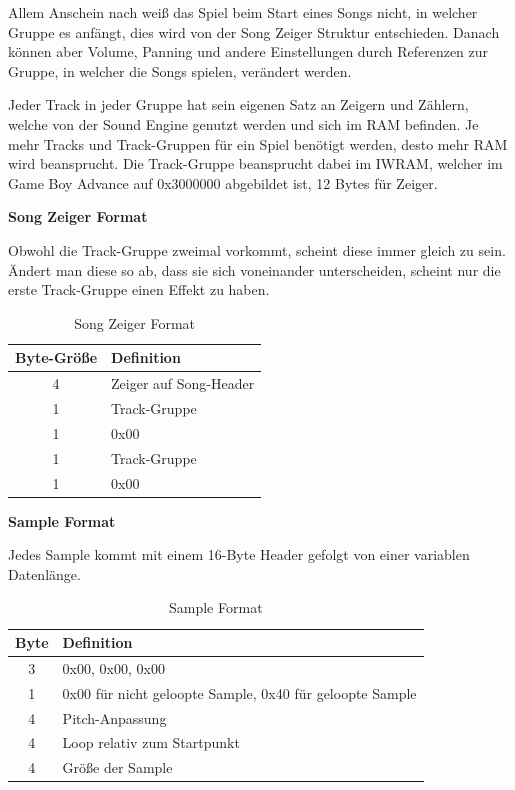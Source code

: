 \documentclass[11pt,a4paper]{scrartcl}
\newcommand{\paratitle}[1] {
    \vspace{5mm}
    \large \textbf{#1} \normalsize
    \vspace{2mm}\newline
}
\begin{document}
Allem Anschein nach wei{\ss} das Spiel beim Start eines Songs nicht, in welcher Gruppe es anf\"angt, dies wird von der Song Zeiger Struktur entschieden. Danach k\"onnen aber Volume, Panning und andere Einstellungen durch Referenzen zur Gruppe, in welcher die Songs spielen, ver\"andert werden.

Jeder Track in jeder Gruppe hat sein eigenen Satz an Zeigern und Z\"ahlern, welche von der Sound Engine genutzt werden und sich im RAM befinden. Je mehr Tracks und Track-Gruppen f\"ur ein Spiel ben\"otigt werden, desto mehr RAM wird beansprucht. Die Track-Gruppe beansprucht dabei im IWRAM, welcher im Game Boy Advance auf 0x3000000 abgebildet ist, 12 Bytes f\"ur Zeiger.


\paratitle{Song Zeiger Format}
Obwohl die Track-Gruppe zweimal vorkommt, scheint diese immer gleich zu sein. \"Andert man diese so ab, dass sie sich voneinander unterscheiden, scheint nur die erste Track-Gruppe einen Effekt zu haben.

\begin{table}[h]
    \centering
    \begin{tabular}{ c | p{8cm} }
        \textbf{Byte-Gr\"o{\ss}e} & \textbf{Definition} \\
        \hline
        4 & Zeiger auf Song-Header \\
        \hline
        1 & Track-Gruppe \\
        \hline
        1 & 0x00 \\
        \hline
        1 & Track-Gruppe \\
        \hline
        1 & 0x00 \\
    \end{tabular}
    \caption{Song Zeiger Format}
    \label{table:SongZeiger}
\end{table}


\newpage
\paratitle{Sample Format}
Jedes Sample kommt mit einem 16-Byte Header gefolgt von einer variablen Datenl\"ange.

\begin{table}[h]
    \centering
    \begin{tabular}{ c | p{15cm}}
        \textbf{Byte} & \textbf{Definition} \\
        \hline
        3 & 0x00, 0x00, 0x00 \\
        \hline
        1 & 0x00 f\"ur nicht geloopte Sample, 0x40 f\"ur geloopte Sample \\
        \hline
        4 & Pitch-Anpassung \\
        \hline
        4 & Loop relativ zum Startpunkt \\
        \hline
        4 & Gr\"o{\ss}e der Sample \\
    \end{tabular}
    \caption{Sample Format}
    \label{table:SampleFormat}
\end{table}
\end{document}
